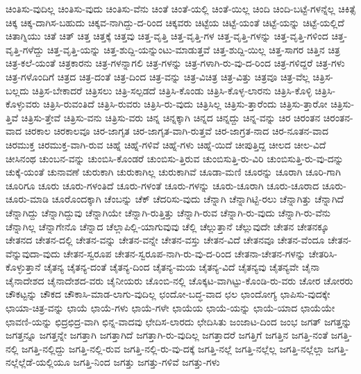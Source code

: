 {ಚಿಂತಿಸು-ವುದಿಲ್ಲ
ಚಿಂತಿಸು-ವುದು
ಚಿಂತಿಸು-ವೆನು
ಚಿಂತೆ
ಚಿಂತೆ-ಯಲ್ಲಿ
ಚಿಂತೆ-ಯಿಲ್ಲ
ಚಿಂದಿ
ಚಿಂದಿ-ಬಟ್ಟೆ-ಗಳನ್ನೆಲ್ಲ
ಚಿಕಿತ್ಸೆ
ಚಿಕ್ಕ
ಚಿಕ್ಕ-ದಾಗಿಸ-ಬಹುದು
ಚಿಕ್ಕವ-ನಾಗಿದ್ದು-ದ-ರಿಂದ
ಚಿಕ್ಕವರು
ಚಿಟ್ಟೆಯ
ಚಿಟ್ಟೆ-ಯಂತೆ
ಚಿಟ್ಟೆ-ಯನ್ನು
ಚಿಟ್ಟೆ-ಯಲ್ಲಿದೆ
ಚಿತಾಗ್ನಿಯು
ಚಿತೆ
ಚಿತ್
ಚಿತ್ತ
ಚಿತ್ತಕ್ಕೆ
ಚಿತ್ತವು
ಚಿತ್ತ-ವೃತ್ತಿ
ಚಿತ್ತ-ವೃತ್ತಿ-ಗಳ
ಚಿತ್ತ-ವೃತ್ತಿ-ಗಳನ್ನು
ಚಿತ್ತ-ವೃತ್ತಿ-ಗಳಿಂದ
ಚಿತ್ತ-ವೃತ್ತಿ-ಗಳೆದ್ದು
ಚಿತ್ತ-ವೃತ್ತಿ-ಯನ್ನು
ಚಿತ್ತ-ಶುದ್ದಿ-ಯನ್ನುಂಟು-ಮಾಡುತ್ತವೆ
ಚಿತ್ತ-ಶುದ್ದಿ-ಯಿಲ್ಲ
ಚಿತ್ತ-ಸಾಗರ
ಚಿತ್ತಿನ
ಚಿತ್ರ
ಚಿತ್ರ-ಕಲೆ-ಯಂತೆ
ಚಿತ್ರಕಾರನು
ಚಿತ್ರ-ಗಳನ್ನಾಗಲಿ
ಚಿತ್ರ-ಗಳನ್ನು
ಚಿತ್ರ-ಗಳಾಗಿ-ರು-ವು-ದ-ರಿಂದ
ಚಿತ್ರ-ಗಳಿದ್ದರೆ
ಚಿತ್ರ-ಗಳು
ಚಿತ್ರ-ಗಳೊಂದಿಗೆ
ಚಿತ್ರದ
ಚಿತ್ರ-ದಂತೆ
ಚಿತ್ರ-ದಿಂದ
ಚಿತ್ರ-ವನ್ನು
ಚಿತ್ರ-ವಿಚಿತ್ರ
ಚಿತ್ರ-ವಿತ್ತು
ಚಿತ್ರವೂ
ಚಿತ್ರ-ವೆಲ್ಲ
ಚಿತ್ರಿಸ-ಬಲ್ಲದು
ಚಿತ್ರಿಸ-ಬೇಕಾದರೆ
ಚಿತ್ರಿಸಲು
ಚಿತ್ರಿ-ಸಲ್ಪಡದೆ
ಚಿತ್ರಿಸಿ-ಕೊಂಡು
ಚಿತ್ರಿಸಿ-ಕೊಳ್ಳ-ಲಾರನು
ಚಿತ್ರಿಸಿ-ಕೊಳ್ಳಿ
ಚಿತ್ರಿಸಿ-ಕೊಳ್ಳುವರು
ಚಿತ್ರಿಸಿ-ರುವಂತಿದೆ
ಚಿತ್ರಿಸಿ-ರುವರು
ಚಿತ್ರಿಸಿ-ರು-ವುದು
ಚಿತ್ರಿಸಿಲ್ಲ
ಚಿತ್ರಿಸು-ತ್ತಾರೆಂದು
ಚಿತ್ರಿಸು-ತ್ತಾರೋ
ಚಿತ್ರಿಸು-ತ್ತಿವೆ
ಚಿತ್ರಿಸು-ತ್ತೇವೆ
ಚಿತ್ರಿಸು-ವನು
ಚಿತ್ರಿಸು-ವರು
ಚಿನ್ನ
ಚಿನ್ನಕ್ಕಾಗಿ
ಚಿನ್ನದ
ಚಿನ್ನದ್ದು
ಚಿನ್ನ-ವನ್ನು
ಚಿರ
ಚಿರಂತನ
ಚಿರಂತನ-ವಾದ
ಚಿರಕಾಲ
ಚಿರಕಾಲವೂ
ಚಿರ-ಜಾಗೃತ
ಚಿರ-ಜಾಗೃತ-ವಾಗಿ-ರುತ್ತವೆ
ಚಿರ-ಜಾಗ್ರತ-ನಾದ
ಚಿರ-ನೂತನ-ವಾದ
ಚಿರಮುಕ್ತ
ಚಿರಮುಕ್ತ-ವಾಗಿ-ರುವ
ಚಿಹ್ನೆ
ಚಿಹ್ನೆ-ಗಳಿವೆ
ಚಿಹ್ನೆ-ಗಳು
ಚಿಹ್ನೆ-ಯಿದೆ
ಚೀಪುತ್ತಿದ್ದ
ಚೀಲದ
ಚೀಲ-ವಿದೆ
ಚೀಸಿನಂಥ
ಚುಂಬನ-ವನ್ನು
ಚುಂಬಿಸಿ-ಕೊಂಡರೆ
ಚುಂಬಿಸು-ತ್ತಿರುವ
ಚುಂಬಿಸುತ್ತಿ-ರು-ವಿರಿ
ಚುಂಬಿಸುತ್ತಿ-ರು-ವು-ದನ್ನು
ಚುಕ್ಕೆ-ಯಂತೆ
ಚುನಾವಣೆ
ಚುರುಕಾಗಿ
ಚುರುಕಾಗಿಲ್ಲ
ಚುರುಕಾಗಿವೆ
ಚೂಡಾ-ಮಣಿ
ಚೂರನ್ನು
ಚೂರಾಗಿ
ಚೂರಿ-ಗಾಗಿ
ಚೂರಿಗೂ
ಚೂರು
ಚೂರು-ಗಳಂತಿದೆ
ಚೂರು-ಗಳಂತೆ
ಚೂರು-ಗಳನ್ನು
ಚೂರು-ಚೂರಾಗಿ
ಚೂರು-ಚೂರಾದ
ಚೂರು-ಚೂರು-ಮಾಡಿ
ಚೂರೊಂದಕ್ಕಾಗಿ
ಚೆಂಬನ್ನು
ಚೆಕ್
ಚೆದರಿಸು-ವುದು
ಚೆನ್ನಾಗಿ
ಚೆನ್ನಾಗಿಟ್ಟಿ-ರಲು
ಚೆನ್ನಾಗಿತ್ತು
ಚೆನ್ನಾಗಿದೆ
ಚೆನ್ನಾಗಿದ್ದು
ಚೆನ್ನಾಗಿದ್ದುವು
ಚೆನ್ನಾಗಿಯೇ
ಚೆನ್ನಾಗಿ-ರುತ್ತಿತ್ತು
ಚೆನ್ನಾಗಿ-ರುವ
ಚೆನ್ನಾಗಿ-ರು-ವುದು
ಚೆನ್ನಾಗಿ-ರು-ವೆನು
ಚೆನ್ನಾಗಿಲ್ಲ
ಚೆನ್ನಾಗೇನೊ
ಚೆನ್ನಾದ
ಚೆಲ್ಲಾಪಿಲ್ಲಿ-ಯಾಗುವುವು
ಚೆಲ್ಲಿ
ಚೆಲ್ಲುತ್ತಾನೆ
ಚೆಲ್ಲುವುದೇ
ಚೇತನ
ಚೇತನಕ್ಕೂ
ಚೇತನದ
ಚೇತನ-ದಲ್ಲಿ
ಚೇತನ-ವನ್ನು
ಚೇತನ-ವನ್ನೇ
ಚೇತನ-ವಸ್ತು
ಚೇತನ-ವಿದೆ
ಚೇತನವೂ
ಚೇತನ-ವೆಂದೂ
ಚೇತನ-ವೆನ್ನುವುದಾ-ವುದು
ಚೇತನ-ಸ್ವರೂಪ
ಚೇತನ-ಸ್ವರೂಪ-ನಾಗಿ-ರು-ವು-ದ-ರಿಂದ
ಚೇತನಾ-ಚೇತನ-ಗಳನ್ನು
ಚೇತರಿಸಿ-ಕೊಳ್ಳುತ್ತಾನೆ
ಚೈತನ್ಯ
ಚೈತನ್ಯ-ದಂತೆ
ಚೈತನ್ಯ-ದಿಂದ
ಚೈತನ್ಯ-ಮಯ
ಚೈತನ್ಯ-ವಿದೆ
ಚೈತನ್ಯವು
ಚೈತನ್ಯವೇ
ಚೈನಾ
ಚೈನಾದೇಶದ
ಚೈನಾದೇಶದ-ವರು
ಚೈನೀಯರು
ಚೊಂಬಿ-ನಲ್ಲಿ
ಚೊಕ್ಕಟ-ವಾಗಿಟ್ಟು-ಕೊಂಡಿ-ರು-ವರು
ಚೋರ
ಚೋರರು
ಚೌಕಟ್ಟನ್ನು
ಚೌಕದ
ಚೌಕಾಸಿ-ಮಾಡ-ಲಾಗು-ವುದಿಲ್ಲ
ಛಂದೋ-ಬದ್ಧ-ವಾದ
ಛಲ
ಛಾಂದೋಗ್ಯ
ಛಾಪಿಸು-ವುದಕ್ಕೇ
ಛಾಯಾ-ಚಿತ್ರ-ವನ್ನು
ಛಾಯೆ
ಛಾಯೆ-ಗಳು
ಛಾಯೆ-ಗಳೇ
ಛಾಯೆಯ
ಛಾಯೆ-ಯನ್ನು
ಛಾಯೆ-ಯಾದ
ಛಾಯೆಯೇ
ಛಾವಣಿ-ಯನ್ನು
ಛಿದ್ರಛಿದ್ರ-ವಾಗಿ
ಛಿನ್ನ-ವಾದವು
ಛೇದಿಸ-ಲಾರದು
ಛೇದಿಸಿತು
ಜಂಜಾಟ-ದಿಂದ
ಜಂಭ
ಜಗತ್
ಜಗತ್ತನ್ನು
ಜಗತ್ತನ್ನೂ
ಜಗತ್ತನ್ನೇ
ಜಗತ್ತಾಗಿ
ಜಗತ್ತಾಗಿದೆ
ಜಗತ್ತಾಗಿ-ರು-ವುದಿಲ್ಲ
ಜಗತ್ತಾದರೆ
ಜಗತ್ತಿಗೆ
ಜಗತ್ತಿನ
ಜಗತ್ತಿ-ನಂತೆ
ಜಗತ್ತಿ-ನಲ್ಲಿ
ಜಗತ್ತಿ-ನಲ್ಲಿದ್ದು
ಜಗತ್ತಿ-ನಲ್ಲಿ-ರುವ
ಜಗತ್ತಿ-ನಲ್ಲಿ-ರು-ವು-ದಕ್ಕೆ
ಜಗತ್ತಿ-ನಲ್ಲೆ
ಜಗತ್ತಿ-ನಲ್ಲೆಲ್ಲ
ಜಗತ್ತಿ-ನಲ್ಲೆಲ್ಲಾ
ಜಗತ್ತಿ-ನಲ್ಲೆಲ್ಲೆಡೆ-ಯಲ್ಲಿಯೂ
ಜಗತ್ತಿ-ನಿಂದ
ಜಗತ್ತು
ಜಗತ್ತು-ಗಳಿವೆ
ಜಗತ್ತು-ಗಳು
}
